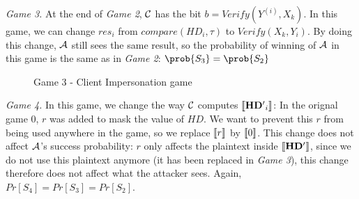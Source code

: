 \textit{Game 3.} At the end of \textit{Game 2}, $\mathcal{C}$ has the bit
$b = Verify(Y^{(i)},X_k)$. In this game, we can change $res_{i}$ from
$compare(HD_{i},\tau)$ to $Verify(X_{k},Y_{i})$. By doing this change,
$\mathcal{A}$ still sees the same result, so the probability of winning of
$\mathcal{A}$ in this game is the same as in \textit{Game 2}: $\prob{S_{3}} = \prob{S_{2}}$
\\
\begin{figure}[htbp!] 
  \centering
  \caption{Game 3 - Client Impersonation game}
  \label{fig:game3protocol1client}
\end{figure}

\textit{Game 4.} In this game, we change the way $\mathcal{C}$ computes
$\left\llbracket\mathbf{HD'}_{i}\right\rrbracket$: In the orignal game 0, $r$ was added to mask the value
of $HD$. We want to prevent this $r$ from being used anywhere in the game, so we
replace $\left\llbracket r\right\rrbracket$ by $\left\llbracket0\right\rrbracket$. This change does not affect $\mathcal{A}$'s
success probability: $r$ only affects the plaintext inside $\left\llbracket\mathbf{HD'}\right\rrbracket$,
since we do not use this plaintext anymore (it has been replaced in \textit{Game
  3}), this
change therefore does not affect what the attacker sees. Again, $Pr[S_4] = Pr[S_3] = Pr[S_2]$.\\

